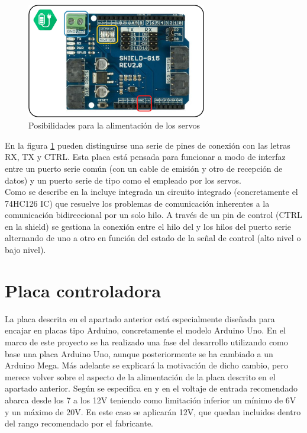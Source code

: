 	\begin{figure}[H]
		\centering
		\includegraphics[width=0.7\textwidth]{figuras/Imagenes_Electronica/alimentacion-shield.jpg}
		\caption{Posibilidades para la alimentación de los servos}
		\label{fig:Electronica:alimentacion-shield}
	\end{figure}

	En la figura \ref{fig:Electronica:alimentacion-shield} pueden distinguirse una serie de pines de conexión con las letras RX, TX y CTRL. Esta placa está pensada para funcionar a modo de interfaz entre un puerto serie común (con un cable de emisión y otro de recepción de datos) y un puerto serie de tipo  como el empleado por los servos.
	\\

	Como se describe en \cite{CytronTechnologies2012} la  incluye integrada un circuito integrado (concretamente el 74HC126 IC) que resuelve los problemas de comunicación inherentes a la comunicación bidireccional por un solo hilo. A través de un pin de control (CTRL en la shield) se gestiona la conexión entre el hilo del  y los hilos del puerto serie alternando de uno a otro en función del estado de la señal de control (alto nivel o bajo nivel).

\section{Placa controladora} \label{sec:Electronica:Placa}

	La placa  descrita en el apartado anterior está especialmente diseñada para encajar en placas tipo Arduino, concretamente el modelo Arduino Uno. En el marco de este proyecto se ha realizado una fase del desarrollo utilizando como base una placa Arduino Uno, aunque posteriormente se ha cambiado a un Arduino Mega. Más adelante se explicará la motivación de dicho cambio, pero merece volver sobre el aspecto de la alimentación de la placa descrito en el apartado anterior. Según se especifica en \cite{arduinoUno} y en \cite{arduinoMega} el voltaje de entrada recomendado abarca desde los 7 a los 12V teniendo como limitación inferior un mínimo de 6V y un máximo de 20V. En este caso se aplicarán 12V, que quedan incluidos dentro del rango recomendado por el fabricante.
	\\


